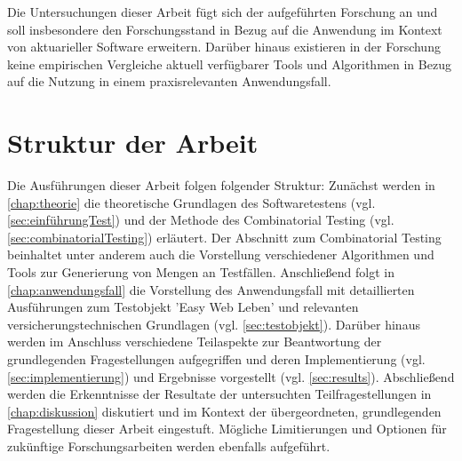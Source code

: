 Die Untersuchungen dieser Arbeit fügt sich der aufgeführten Forschung an und soll insbesondere den Forschungsstand in Bezug auf die Anwendung im Kontext von aktuarieller Software erweitern. Darüber hinaus existieren in der Forschung keine empirischen Vergleiche aktuell verfügbarer Tools und Algorithmen in Bezug auf die Nutzung in einem praxisrelevanten Anwendungsfall.

\section{Struktur der Arbeit}\label{sec:strukturderArbeit}

Die Ausführungen dieser Arbeit folgen folgender Struktur: Zunächst werden in \autoref{chap:theorie} die theoretische Grundlagen des Softwaretestens (vgl. \autoref{sec:einführungTest}) und der Methode des Combinatorial Testing (vgl. \autoref{sec:combinatorialTesting}) erläutert. Der Abschnitt zum Combinatorial Testing beinhaltet unter anderem auch die Vorstellung verschiedener Algorithmen und Tools zur Generierung von Mengen an Testfällen. Anschließend folgt in \autoref{chap:anwendungsfall} die Vorstellung des Anwendungsfall mit detaillierten Ausführungen zum Testobjekt 'Easy Web Leben' und relevanten versicherungstechnischen Grundlagen (vgl. \autoref{sec:testobjekt}). Darüber hinaus werden im Anschluss verschiedene Teilaspekte zur Beantwortung der grundlegenden Fragestellungen aufgegriffen und deren Implementierung (vgl. \autoref{sec:implementierung}) und Ergebnisse vorgestellt (vgl. \autoref{sec:results}). Abschließend werden die Erkenntnisse der Resultate der untersuchten Teilfragestellungen in \autoref{chap:diskussion} diskutiert und im Kontext der übergeordneten, grundlegenden Fragestellung dieser Arbeit eingestuft. Mögliche Limitierungen und Optionen für zukünftige Forschungsarbeiten werden ebenfalls aufgeführt.
